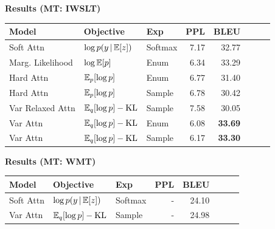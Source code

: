 \documentclass[aspectratio=169]{beamer}
\newcommand{\thetitle}[1]{{\begin{center}\textbf{{#1}}\end{center}}}
\begin{document}
\begin{frame}\thetitle{Results (MT: IWSLT)}
\begin{table}
  \centering
  \begin{tabular}{lllrrrrr}
    \toprule
    Model & Objective & Exp  & PPL &  BLEU \\
    \midrule
  Soft Attn & $\log p(y \,|\, \mathbb{E}[z])$ & Softmax & 7.17 &  32.77 \\
  Marg. Likelihood & $\log \mathbb{E}[p]$ &  Enum & 6.34  & 33.29\\
  Hard Attn  & $\mathbb{E}_p[\log p]$ & Enum & 6.77 &  31.40\\
  Hard Attn  & $\mathbb{E}_p[\log p]$  & Sample &  6.78 &   30.42\\
  Var Relaxed Attn& $\mathbb{E}_q[\log p] - \operatorname*{KL}$ & Sample & 7.58	 & 30.05 \\
  Var Attn  & $\mathbb{E}_q[\log p] - \operatorname*{KL}$ & Enum & 6.08&  \textbf{33.69} \\
  Var Attn &  $\mathbb{E}_q[\log p] - \operatorname*{KL}$ &Sample& 6.17&  \textbf{33.30} \\
    \bottomrule
  \end{tabular}

\end{table}
\end{frame}

\begin{frame}\thetitle{Results (MT: WMT)}
\begin{table}
  \centering
  \begin{tabular}{lllrrrrr}
    \toprule
    Model & Objective & Exp  & PPL &  BLEU \\
    \midrule
  Soft Attn & $\log p(y \,|\, \mathbb{E}[z])$ & Softmax & - &  24.10 \\
  Var Attn &  $\mathbb{E}_q[\log p] - \operatorname*{KL}$ &Sample& - &  24.98 \\
    \bottomrule
  \end{tabular}

\end{table}
\end{frame}
\end{document}
